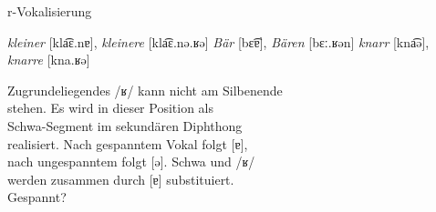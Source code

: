 \begin{frame}
  {r-Vokalisierung}
  \pause
  \begin{exe}
    \ex
    \begin{xlist}
      \ex \textit{kleiner} [kla͡ɛ.nɐ], \textit{kleinere} [kla͡ɛ.nə.ʁə]
      \pause
      \ex \textit{Bär} [bɛ͡ɐ], \textit{Bären} [bɛː.ʁən]
      \pause
      \ex \textit{knarr} [kna͡ə], \textit{knarre} [kna.ʁə]
    \end{xlist}
  \end{exe}
  \pause
  \Zeile
  \Large
  Zugrundeliegendes /ʁ/ kann nicht am Silbenende\\
  stehen. Es wird in dieser Position als\\
  Schwa-Segment im sekundären Diphthong\\
  realisiert. Nach gespanntem Vokal folgt [ɐ],\\
  nach ungespanntem folgt [ə]. Schwa und /ʁ/\\
  werden zusammen durch [ɐ] substituiert.\\[0.5\baselineskip]
  \pause
  \alert{Gespannt?}
\end{frame}


